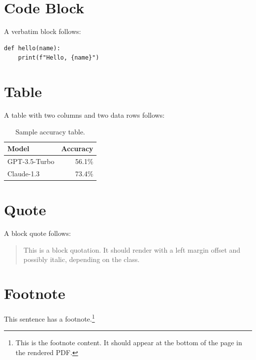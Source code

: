 \documentclass{article}
\begin{document}
\section{Code Block}

A verbatim block follows:

\begin{verbatim}
def hello(name):
    print(f"Hello, {name}")
\end{verbatim}

\section{Table}

A table with two columns and two data rows follows:

\begin{table}[h]
    \centering
    \begin{tabular}{|l|r|}
        \hline
        \textbf{Model} & \textbf{Accuracy} \\
        \hline
        GPT-3.5-Turbo & 56.1\% \\
        Claude-1.3 & 73.4\% \\
        \hline
    \end{tabular}
    \caption{Sample accuracy table.}
\end{table}

\section{Quote}

A block quote follows:

\begin{quote}
    This is a block quotation. It should render with a left margin offset
    and possibly italic, depending on the class.
\end{quote}

\section{Footnote}

This sentence has a footnote.\footnote{This is the footnote content. It should appear at
the bottom of the page in the rendered PDF.}
\end{document}
